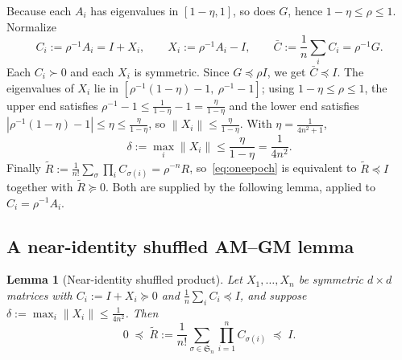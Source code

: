 \documentclass[11pt]{article}
\newtheorem{lemma}[theorem]{Lemma}
\theoremstyle{definition}
\theoremstyle{remark}
\newcommand{\Sn}{\mathfrak{S}_n}
\newcommand{\norm}[1]{\left\lVert #1 \right\rVert}
\newcommand{\psdle}{\preceq}
\newcommand{\psdge}{\succeq}
\begin{document}
Because each $A_i$ has eigenvalues in $[1-\eta,1]$, so does $G$, hence $1-\eta\le\rho\le1$. Normalize
\[
C_i:=\rho^{-1}A_i=I+X_i,\qquad X_i:=\rho^{-1}A_i-I,\qquad \bar C:=\frac1n\sum_iC_i=\rho^{-1}G.
\]
Each $C_i\succ0$ and each $X_i$ is symmetric. Since $G\psdle\rho I$, we get $\bar C\psdle I$.
The eigenvalues of $X_i$ lie in $[\rho^{-1}(1-\eta)-1,\ \rho^{-1}-1]$; using $1-\eta\le\rho\le1$, the
upper end satisfies $\rho^{-1}-1\le\frac{1}{1-\eta}-1=\frac{\eta}{1-\eta}$ and the lower end satisfies
$|\rho^{-1}(1-\eta)-1|\le\eta\le\frac{\eta}{1-\eta}$, so $\norm{X_i}\le\frac{\eta}{1-\eta}$. With
$\eta=\frac1{4n^2+1}$,
\begin{equation}\label{eq:delta}
\delta:=\max_i\norm{X_i}\le\frac{\eta}{1-\eta}=\frac1{4n^2}.
\end{equation}
Finally $\widetilde R:=\frac1{n!}\sum_\sigma\prod_iC_{\sigma(i)}=\rho^{-n}R$, so~\eqref{eq:oneepoch}
is equivalent to $\widetilde R\psdle I$ together with $\widetilde R\psdge0$. Both are supplied by the
following lemma, applied to $C_i=\rho^{-1}A_i$.

\subsection{A near-identity shuffled AM--GM lemma}

\begin{lemma}[Near-identity shuffled product]\label{lem:amgm}
Let $X_1,\dots,X_n$ be symmetric $d\times d$ matrices with $C_i:=I+X_i\psdge0$ and
$\frac1n\sum_iC_i\psdle I$, and suppose $\delta:=\max_i\norm{X_i}\le\frac1{4n^2}$. Then
\[
0\;\psdle\;\widetilde R:=\frac1{n!}\sum_{\sigma\in\Sn}\prod_{i=1}^n C_{\sigma(i)}\;\psdle\;I.
\]
\end{lemma}
\end{document}
